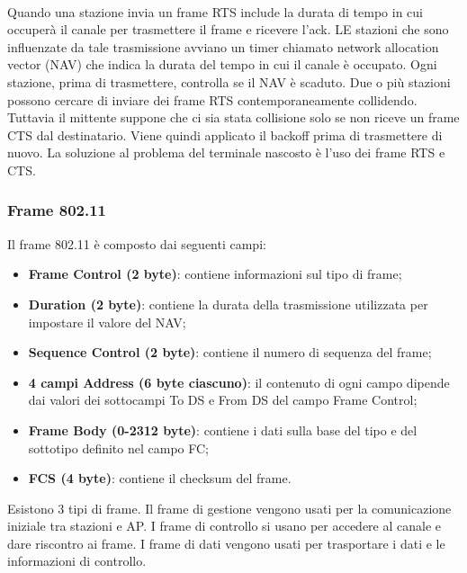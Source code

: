 \documentclass[12pt]{report}
\begin{document}
\vspace{\baselineskip}\\
Quando una stazione invia un frame RTS include la durata di tempo in cui occuperà il canale per trasmettere il frame e ricevere l'ack. LE stazioni che sono influenzate da tale trasmissione avviano un timer chiamato network allocation vector (NAV) che indica la durata del tempo in cui il canale è occupato. Ogni stazione, prima di trasmettere, controlla se il NAV è scaduto. Due o più stazioni possono cercare di inviare dei frame RTS contemporaneamente collidendo. Tuttavia il mittente suppone che ci sia stata collisione solo se non riceve un frame CTS dal destinatario. Viene quindi applicato il backoff prima di trasmettere di nuovo. La soluzione al problema del terminale nascosto è l'uso dei frame RTS e CTS.

\subsubsection{Frame 802.11}
Il frame 802.11 è composto dai seguenti campi:
\begin{itemize}
	\item \textbf{Frame Control (2 byte)}: contiene informazioni sul tipo di frame;
	\item \textbf{Duration (2 byte)}: contiene la durata della trasmissione utilizzata per impostare il valore del NAV;
	\item \textbf{Sequence Control (2 byte)}: contiene il numero di sequenza del frame;
	\item \textbf{4 campi Address (6 byte ciascuno)}: il contenuto di ogni campo dipende dai valori dei sottocampi To DS e From DS del campo Frame Control;
	\item \textbf{Frame Body (0-2312 byte)}: contiene i dati sulla base del tipo e del sottotipo definito nel campo FC;
	\item \textbf{FCS (4 byte)}: contiene il checksum del frame.
\end{itemize}
Esistono 3 tipi di frame. Il frame di gestione vengono usati per la comunicazione iniziale tra stazioni e AP. I frame di controllo si usano per accedere al canale e dare riscontro ai frame. I frame di dati vengono usati per trasportare i dati e le informazioni di controllo.
\end{document}

